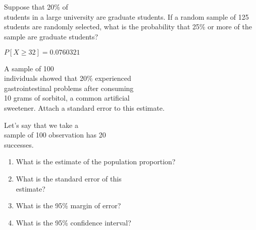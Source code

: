 \documentclass[11pt]{book}\usepackage[]{graphicx}\usepackage[]{color}
\begin{document}

\twocolumn

\section{}

\begin{exercises}
  \begin{exercise}   %
  


   Suppose that 20\%  of \\ students in a large university are graduate students.  If a random sample of 125 students are randomly selected, what is the probability that 25\% or more of the sample are graduate students?

  
  \end{exercise}
  \begin{solution}
  
    $P[ X \ge 32 ] = 0.0760321$
  \end{solution}

  \begin{exercise} %



A sample of 100 \\ individuals  showed that 20\% experienced \\ gastrointestinal  problems  after consuming \\ 10 grams of sorbitol, a common artificial \\ sweetener.  Attach a standard error to this estimate.
  \end{exercise}
%
%

  \begin{exercise} %



Let's say that we take a \\ sample of 100 observation has 20 \\ successes.

\begin{enumerate}
\item What is the estimate of the population proportion?
\item What is the standard error of this \\ estimate?
\item What is the 95\% margin of error?
\item What is the 95\% confidence interval?
\end{enumerate}


\end{exercise}
\end{exercises}
\end{document}
